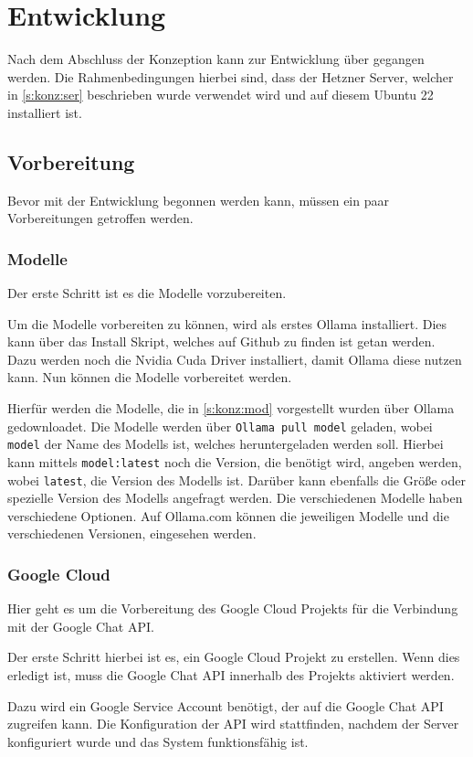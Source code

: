 \chapter{Entwicklung}
\label{c:dev}
Nach dem Abschluss der Konzeption kann zur Entwicklung über gegangen werden.
Die Rahmenbedingungen hierbei sind, dass der Hetzner Server, welcher in 
\ref*{s:konz:ser} beschrieben wurde verwendet wird und auf diesem Ubuntu
22 installiert ist.

\section{Vorbereitung}
Bevor mit der Entwicklung begonnen werden kann, müssen ein paar 
Vorbereitungen getroffen werden.

\subsection{Modelle}
\label{s:ent:mod}
Der erste Schritt ist es die Modelle vorzubereiten.\par
Um die Modelle vorbereiten zu können, wird als erstes 
Ollama installiert.
Dies kann über das Install Skript, welches auf Github zu finden \cite{OllamaOllama2024}
ist getan werden. Dazu werden noch die Nvidia Cuda Driver installiert, 
damit Ollama diese nutzen kann. Nun können die Modelle vorbereitet werden.\par

Hierfür werden die Modelle, die in \ref*{s:konz:mod} vorgestellt 
wurden über Ollama gedownloadet.
Die Modelle werden über \verb|Ollama pull model| geladen, wobei \verb|model| der Name
des Modells ist, welches heruntergeladen werden soll. Hierbei kann
mittels \verb|model:latest| noch die Version, die benötigt wird, angeben werden, wobei \verb|latest|, die Version des Modells ist. 
Darüber kann ebenfalls die Größe oder spezielle Version des Modells 
angefragt werden. Die verschiedenen Modelle haben verschiedene 
Optionen. Auf Ollama.com
können die jeweiligen Modelle und die verschiedenen Versionen, eingesehen werden.

\subsection{Google Cloud}
Hier geht es um die Vorbereitung des Google Cloud Projekts für die Verbindung 
mit der Google Chat API.\par
Der erste Schritt hierbei ist es, ein Google Cloud Projekt zu erstellen.
Wenn dies erledigt ist, muss die Google Chat API innerhalb des 
Projekts aktiviert werden.\par
Dazu wird ein Google Service Account benötigt, der auf die Google Chat API zugreifen kann.
Die Konfiguration der API wird stattfinden, nachdem der Server konfiguriert wurde 
und das System funktionsfähig ist.

